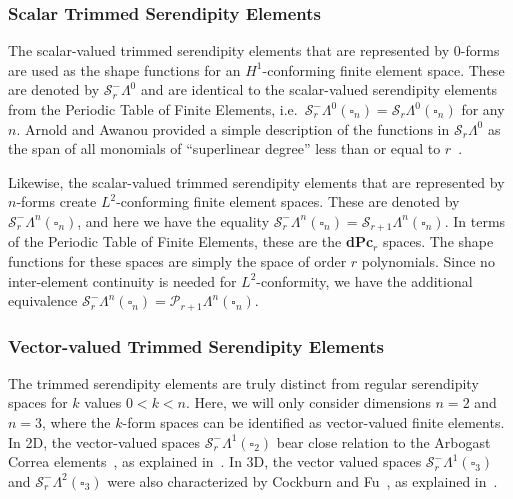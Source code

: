 \documentclass[format=acmsmall,screen,timestamp=false,a4paper]{acmart}
\newcommand{\calP}{\mathcal{P}}
\newcommand{\calS}{\mathcal{S}}
\begin{document}
  
  \subsubsection{Scalar Trimmed Serendipity Elements}
  The scalar-valued trimmed serendipity elements that are represented by $0$-forms are used as the shape functions for an $H^1$-conforming finite element space.  These are denoted by $\calS_r^-\Lambda^0$ and are identical to the scalar-valued serendipity elements from the Periodic Table of Finite Elements, i.e.\ $\calS_r^-\Lambda^0(\square_n) = \calS_r\Lambda^0(\square_n)$ for any $n$.  Arnold and Awanou provided a simple description of the functions in $\mathcal{S}_r\Lambda^0$ as the span of all monomials of ``superlinear degree'' less than or equal to $r$~\cite{arnold2011serendipity}. 
  
  Likewise, the scalar-valued trimmed serendipity elements that are represented by $n$-forms create $L^2$-conforming finite element spaces.  These are denoted by $\calS_r^-\Lambda^n(\square_n)$, and here we have the equality $\calS_r^-\Lambda^n(\square_n) = \calS_{r+1}\Lambda^n(\square_n)$.  In terms of the Periodic Table of Finite Elements, these are the \textbf{dPc}$_r$ spaces.  The shape functions for these spaces are simply the space of order $r$ polynomials.  Since no inter-element continuity is needed for $L^2$-conformity, we have the additional equivalence $\calS_r^-\Lambda^n(\square_n) = \calP_{r+1}\Lambda^n(\square_n)$.
  
  \subsubsection{Vector-valued Trimmed Serendipity Elements}
  

	The trimmed serendipity elements are truly distinct from regular serendipity spaces for $k$ values $0<k<n$.  Here, we will only consider dimensions $n=2$ and $n=3$, where the $k$-form spaces can be identified as vector-valued finite elements.  	
	In 2D, the vector-valued spaces $\calS_r^-\Lambda^1(\square_2)$ bear close relation to the Arbogast Correa elements~\cite{arbogast2016two}, as explained in~\cite[Prop 2.2]{gillette2019trimmed}.
	In 3D, the vector valued spaces $\calS_r^-\Lambda^1(\square_3)$ and $\calS_r^-\Lambda^2(\square_3)$ were also characterized by Cockburn and Fu~\cite{CF2016}, as explained in~\cite[Prop 2.3]{gillette2019trimmed}.
\end{document}
